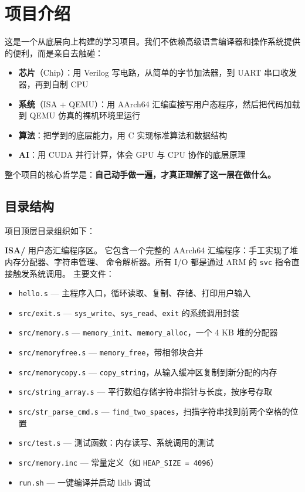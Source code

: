 \chapter{项目介绍}

这是一个从底层向上构建的学习项目。我们不依赖高级语言编译器和操作系统提供的便利，而是亲自去触碰：
\begin{itemize}
    \item \textbf{芯片}（Chip）：用 Verilog 写电路，从简单的字节加法器，到 UART 串口收发器，再到自制 CPU
    \item \textbf{系统}（ISA + QEMU）：用 AArch64 汇编直接写用户态程序，然后把代码加载到 QEMU 仿真的裸机环境里运行
    \item \textbf{算法}：把学到的底层能力，用 C 实现标准算法和数据结构
    \item \textbf{AI}：用 CUDA 并行计算，体会 GPU 与 CPU 协作的底层原理
\end{itemize}

整个项目的核心哲学是：\textbf{自己动手做一遍，才真正理解了这一层在做什么。}

\section{目录结构}

项目顶层目录组织如下：

\vspace{0.5cm}

\noindent\textbf{ISA/} \quad 用户态汇编程序区。
它包含一个完整的 AArch64 汇编程序：手工实现了堆内存分配器、字符串管理、
命令解析器。所有 I/O 都是通过 ARM 的 \texttt{svc} 指令直接触发系统调用。
主要文件：
\begin{itemize}
    \item \texttt{hello.s} — 主程序入口，循环读取、复制、存储、打印用户输入
    \item \texttt{src/exit.s} — \texttt{sys\_write}、\texttt{sys\_read}、\texttt{exit} 的系统调用封装
    \item \texttt{src/memory.s} — \texttt{memory\_init}、\texttt{memory\_alloc}，一个 4 KB 堆的分配器
    \item \texttt{src/memoryfree.s} — \texttt{memory\_free}，带相邻块合并
    \item \texttt{src/memorycopy.s} — \texttt{copy\_string}，从输入缓冲区复制到新分配的内存
    \item \texttt{src/string\_array.s} — 平行数组存储字符串指针与长度，按序号存取
    \item \texttt{src/str\_parse\_cmd.s} — \texttt{find\_two\_spaces}，扫描字符串找到前两个空格的位置
    \item \texttt{src/test.s} — 测试函数：内存读写、系统调用的测试
    \item \texttt{src/memory.inc} — 常量定义（如 \texttt{HEAP\_SIZE = 4096}）
    \item \texttt{run.sh} — 一键编译并启动 lldb 调试
\end{itemize}

